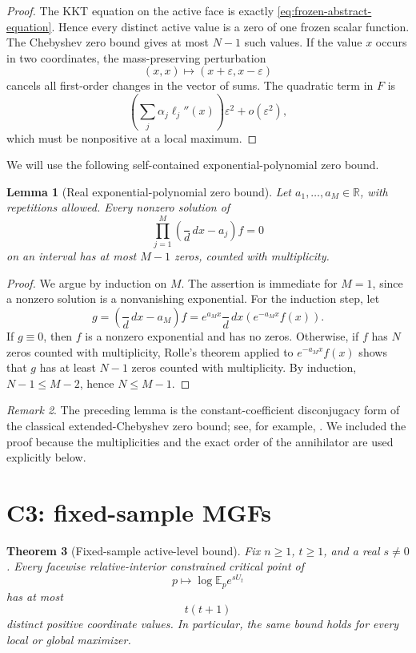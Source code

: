 \documentclass[11pt]{article}
\theoremstyle{plain}
\newtheorem{theorem}{Theorem}[section]
\newtheorem{lemma}[theorem]{Lemma}
\theoremstyle{definition}
\theoremstyle{remark}
\newtheorem{remark}[theorem]{Remark}
\newcommand{\E}{\mathbb E}
\newcommand{\R}{\mathbb R}
\newcommand{\dd}{\,d}
\begin{document}
\begin{proof}
The KKT equation on the active face is exactly \eqref{eq:frozen-abstract-equation}.  Hence every distinct active value is a zero of one frozen scalar function.  The Chebyshev zero bound gives at most \(N-1\) such values.  If the value \(x\) occurs in two coordinates, the mass-preserving perturbation
\[
(x,x)\mapsto(x+\varepsilon,x-\varepsilon)
\]
cancels all first-order changes in the vector of sums.  The quadratic term in \(F\) is
\[
\left(\sum_j\alpha_j\ell_j''(x)\right)\varepsilon^2+o(\varepsilon^2),
\]
which must be nonpositive at a local maximum.
\end{proof}

We will use the following self-contained exponential-polynomial zero bound.

\begin{lemma}[Real exponential-polynomial zero bound]\label{lem:exp-poly-zero}
Let \(a_1,\ldots,a_M\in\R\), with repetitions allowed.  Every nonzero solution of
\[
\prod_{j=1}^M\left(\frac\dd{\dd x}-a_j\right)f=0
\]
on an interval has at most \(M-1\) zeros, counted with multiplicity.
\end{lemma}

\begin{proof}
We argue by induction on \(M\).  The assertion is immediate for \(M=1\), since a nonzero solution is a nonvanishing exponential.  For the induction step, let
\[
g=\left(\frac\dd{\dd x}-a_M\right)f
=e^{a_Mx}\frac\dd{\dd x}\left(e^{-a_Mx}f(x)\right).
\]
If \(g\equiv0\), then \(f\) is a nonzero exponential and has no zeros.  Otherwise, if \(f\) has \(N\) zeros counted with multiplicity, Rolle's theorem applied to \(e^{-a_Mx}f(x)\) shows that \(g\) has at least \(N-1\) zeros counted with multiplicity.  By induction, \(N-1\le M-2\), hence \(N\le M-1\).
\end{proof}

\begin{remark}
The preceding lemma is the constant-coefficient disconjugacy form of the classical extended-Chebyshev zero bound; see, for example, \cite{KarlinStudden1966}.  We included the proof because the multiplicities and the exact order of the annihilator are used explicitly below.
\end{remark}

\section{C3: fixed-sample MGFs}

\begin{theorem}[Fixed-sample active-level bound]\label{thm:C3-new}
Fix \(n\ge1\), \(t\ge1\), and a real \(s\ne0\).  Every facewise relative-interior constrained critical point of
\[
p\longmapsto\log\E_p e^{sU_t}
\]
has at most
\begin{equation}\label{eq:C3-bound-new}
t(t+1)
\end{equation}
distinct positive coordinate values.  In particular, the same bound holds for every local or global maximizer.
\end{theorem}
\end{document}
